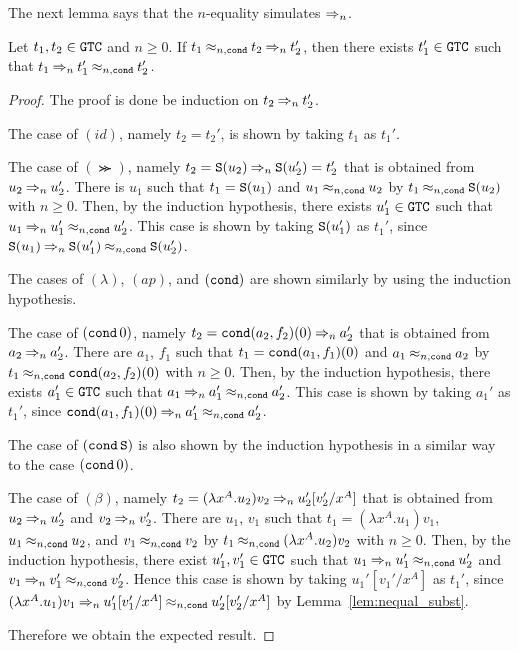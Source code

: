 The next lemma says that the $n$-equality simulates $\mathbin{\Rightarrow_{n}}$.
\begin{lemma}\label{lem:parallel_eq}
  Let $t_1, t_2 \in {\tt GTC}$ and $n\ge 0$.
  If $t_1 \mathbin{\approx_{n,{\tt cond}}} t_2 \mathbin{\Rightarrow_{n}} t_2'$,
  then there exists $t_1'\in {\tt GTC}$ such that $t_1 \mathbin{\Rightarrow_{n}} t_1' \mathbin{\approx_{n,{\tt cond}}} t_2'$.
\end{lemma}
\begin{proof}
  The proof is done be induction on $t_2 \mathbin{\Rightarrow_{n}} t_2'$.
  
  The case of $(id)$, namely $t_2=t_2'$, is shown by taking $t_1$ as $t_1'$.
  
  The case of $(\Succ)$, namely $t_2={\tt S}(u_2) \mathbin{\Rightarrow_{n}} {\tt S}(u_2')=t_2'$ that is obtained
  from $u_2\mathbin{\Rightarrow_{n}} u_2'$. 
  There is $u_1$ such that $t_1 = {\tt S}(u_1)$ and $u_1\mathbin{\approx_{n,{\tt cond}}} u_2$ by $t_1 \mathbin{\approx_{n,{\tt cond}}} {\tt S}(u_2)$ with $n\ge 0$.
  Then, by the induction hypothesis,
  there exists $u_1'\in{\tt GTC}$ such that $u_1 \mathbin{\Rightarrow_{n}} u_1' \mathbin{\approx_{n,{\tt cond}}} u_2'$.  
  This case is shown by taking ${\tt S}(u_1')$ as $t_1'$,
  since ${\tt S}(u_1) \mathbin{\Rightarrow_{n}} {\tt S}(u_1') \mathbin{\approx_{n,{\tt cond}}} {\tt S}(u_2')$.
  
  The cases of $(\lambda)$, $(ap)$, and $({\tt cond})$ are shown similarly by using the induction hypothesis.
  
  The case of $({\tt cond}\,0)$, namely $t_2 = {\tt cond}(a_2,f_2)(0) \mathbin{\Rightarrow_{n}} a_2'$ that is
  obtained from $a_2 \mathbin{\Rightarrow_{n}} a_2'$.
  There are $a_1$, $f_1$ such that $t_1 = {\tt cond}(a_1,f_1)(0)$ and $a_1 \mathbin{\approx_{n,{\tt cond}}} a_2$
  by $t_1 \mathbin{\approx_{n,{\tt cond}}} {\tt cond}(a_2,f_2)(0)$ with $n\ge 0$.
  Then, by the induction hypothesis,
  there exists $a_1'\in{\tt GTC}$ such that $a_1 \mathbin{\Rightarrow_{n}} a_1' \mathbin{\approx_{n,{\tt cond}}} a_2'$.  
  This case is shown by taking $a_1'$ as $t_1'$,
  since ${\tt cond}(a_1,f_1)(0) \mathbin{\Rightarrow_{n}} a_1' \mathbin{\approx_{n,{\tt cond}}} a_2'$.  

  The case of $({\tt cond}\,{\tt S})$ is also shown by the induction hypothesis in a similar way to the case $({\tt cond}\,0)$.
  
  The case of $(\beta)$, namely $t_2 = (\lambda x^A.u_2)v_2 \mathbin{\Rightarrow_{n}} u_2'[v_2'/x^A]$ that is 
  obtained from $u_2 \mathbin{\Rightarrow_{n}} u_2'$ and $v_2 \mathbin{\Rightarrow_{n}} v_2'$.
  There are $u_1$, $v_1$ such that $t_1 = (\lambda x^A.u_1)v_1$, $u_1 \mathbin{\approx_{n,{\tt cond}}} u_2$, and $v_1 \mathbin{\approx_{n,{\tt cond}}} v_2$
  by $t_1 \mathbin{\approx_{n,{\tt cond}}} (\lambda x^A.u_2)v_2$ with $n\ge 0$.
  Then, by the induction hypothesis,
  there exist $u_1',v_1'\in{\tt GTC}$ such that $u_1 \mathbin{\Rightarrow_{n}} u_1' \mathbin{\approx_{n,{\tt cond}}} u_2'$ and
  $v_1 \mathbin{\Rightarrow_{n}} v_1' \mathbin{\approx_{n,{\tt cond}}} v_2'$.
  Hence this case is shown by taking $u_1'[v_1'/x^A]$ as $t_1'$,
  since $(\lambda x^A.u_1)v_1 \mathbin{\Rightarrow_{n}} u_1'[v_1'/x^A] \mathbin{\approx_{n,{\tt cond}}} u_2'[v_2'/x^A]$ by Lemma~\ref{lem:nequal_subst}.
  
  Therefore we obtain the expected result. 
\end{proof}

